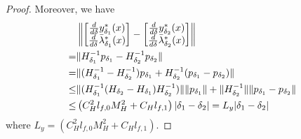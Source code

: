 \documentclass{article}
\newcommand{\pth}[1]{\left( #1 \right)}
\theoremstyle{plain}
\theoremstyle{definition}
\theoremstyle{remark}
\begin{document}
\begin{proof}
Moreover, we have
\begin{align*}
    &\left\|\begin{bmatrix}
    \frac{d}{d \delta} y^*_{\delta_1}(x) \\
    \frac{d}{d \delta} \Bar{\lambda}^*_{\delta_1}(x)
    \end{bmatrix}-\begin{bmatrix}
    \frac{d}{d \delta} y^*_{\delta_2}(x) \\
    \frac{d}{d \delta} \Bar{\lambda}^*_{\delta_2}(x)
    \end{bmatrix}\right\|\\
    =& \|H_{\delta_1}^{-1}p_{\delta_1}-H_{\delta_2}^{-1}p_{\delta_2}\|\\
    =&\|(H_{\delta_1}^{-1}-H_{\delta_2}^{-1})p_{\delta_1}+H_{\delta_2}^{-1}(p_{\delta_1}-p_{\delta_2})\|\\
    \leq&\|(H_{\delta_1}^{-1}(H_{\delta_2}-H_{\delta_1})H_{\delta_2}^{-1})\|\|p_{\delta_1}\|+\|H_{\delta_2}^{-1}\|\|p_{\delta_1}-p_{\delta_2}\|\\
    \leq& \pth{C_H^2l_{f,0}M_H^2+C_Hl_{f,1}}|\delta_1-\delta_2|
    =L_y|\delta_1-\delta_2|
\end{align*}
where $L_y=\pth{C_H^2l_{f,0}M_H^2+C_Hl_{f,1}}$.


\end{proof}
\end{document}
